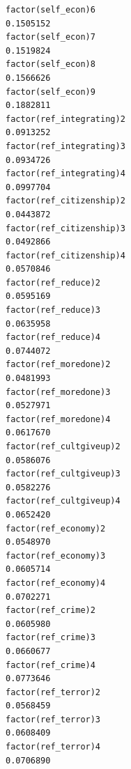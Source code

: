 \documentclass[
]{article}
\begin{document}
\begin{table}
\begin{minipage}[t]{\linewidth}
{\begin{verbatim}
factor(self_econ)6                                                                 0.1505152
factor(self_econ)7                                                                 0.1519824
factor(self_econ)8                                                                 0.1566626
factor(self_econ)9                                                                 0.1882811
factor(ref_integrating)2                                                           0.0913252
factor(ref_integrating)3                                                           0.0934726
factor(ref_integrating)4                                                           0.0997704
factor(ref_citizenship)2                                                           0.0443872
factor(ref_citizenship)3                                                           0.0492866
factor(ref_citizenship)4                                                           0.0570846
factor(ref_reduce)2                                                                0.0595169
factor(ref_reduce)3                                                                0.0635958
factor(ref_reduce)4                                                                0.0744072
factor(ref_moredone)2                                                              0.0481993
factor(ref_moredone)3                                                              0.0527971
factor(ref_moredone)4                                                              0.0617670
factor(ref_cultgiveup)2                                                            0.0586076
factor(ref_cultgiveup)3                                                            0.0582276
factor(ref_cultgiveup)4                                                            0.0652420
factor(ref_economy)2                                                               0.0548970
factor(ref_economy)3                                                               0.0605714
factor(ref_economy)4                                                               0.0702271
factor(ref_crime)2                                                                 0.0605980
factor(ref_crime)3                                                                 0.0660677
factor(ref_crime)4                                                                 0.0773646
factor(ref_terror)2                                                                0.0568459
factor(ref_terror)3                                                                0.0608409
factor(ref_terror)4                                                                0.0706890

\end{verbatim}}
\end{minipage}
\end{table}
\end{document}
